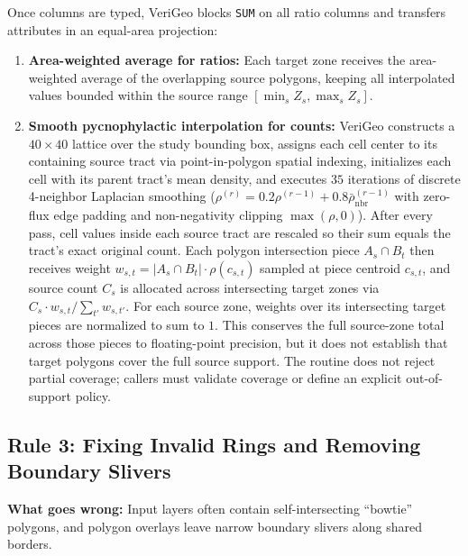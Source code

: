 \documentclass[10pt,twocolumn]{article}
\begin{document}
Once columns are typed, VeriGeo blocks \texttt{SUM} on all ratio columns and transfers attributes in an equal-area projection:
\begin{enumerate}
  \item \textbf{Area-weighted average for ratios:} Each target zone receives the area-weighted average of the overlapping source polygons, keeping all interpolated values bounded within the source range $[\min_s Z_s, \max_s Z_s]$.
  \item \textbf{Smooth pycnophylactic interpolation for counts:} VeriGeo constructs a $40 \times 40$ lattice over the study bounding box, assigns each cell center to its containing source tract via point-in-polygon spatial indexing, initializes each cell with its parent tract's mean density, and executes $35$ iterations of discrete 4-neighbor Laplacian smoothing ($\rho^{(r)} = 0.2 \rho^{(r-1)} + 0.8 \bar{\rho}_{\text{nbr}}^{(r-1)}$ with zero-flux edge padding and non-negativity clipping $\max(\rho, 0)$). After every pass, cell values inside each source tract are rescaled so their sum equals the tract's exact original count. Each polygon intersection piece $A_s \cap B_t$ then receives weight $w_{s,t} = |A_s \cap B_t| \cdot \rho(c_{s,t})$ sampled at piece centroid $c_{s,t}$, and source count $C_s$ is allocated across intersecting target zones via $C_s \cdot w_{s,t} / \sum_{t'} w_{s,t'}$. For each source zone, weights over its intersecting target pieces are normalized to sum to $1$. This conserves the full source-zone total across those pieces to floating-point precision, but it does not establish that target polygons cover the full source support. The routine does not reject partial coverage; callers must validate coverage or define an explicit out-of-support policy.
\end{enumerate}

\subsection{Rule 3: Fixing Invalid Rings and Removing Boundary Slivers}
\textbf{What goes wrong:} Input layers often contain self-intersecting ``bowtie'' polygons, and polygon overlays leave narrow boundary slivers along shared borders.
\end{document}
